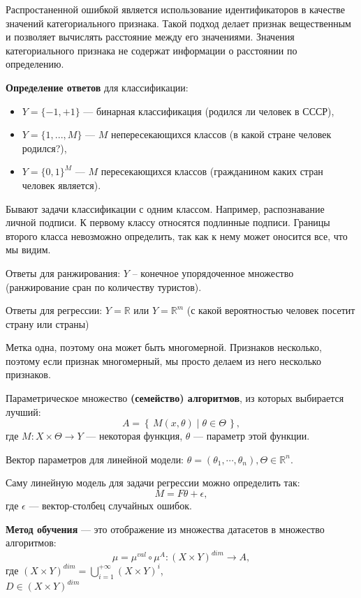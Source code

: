 Распростаненной ошибкой является использование идентификаторов в качестве
значений категориального признака. Такой подход делает признак вещественным
и позволяет вычислять расстояние между его значениями. Значения категориального
признака не содержат информации о расстоянии по определению.

\textbf{Определение ответов} для классификации:
\begin{itemize}
    \item $Y = \{-1, +1\}$ --- бинарная классификация (родился ли человек в
        СССР),
    \item $Y = \{1, ..., M\}$ --- $M$ непересекающихся классов (в какой стране
        человек родился?),
    \item $Y = \{0, 1\}^M $ --- $M$ пересекающихся классов (гражданином каких
        стран человек является).
\end{itemize}

Бывают задачи классификации с одним классом. Например, распознавание личной
подписи. К первому классу относятся подлинные подписи. Границы второго класса
невозможно определить, так как к нему может оносится все, что мы видим.

Ответы для ранжирования: $Y$ -- конечное упорядоченное множество (ранжирование
сран по количеству туристов).

Ответы для регрессии: $Y = \mathbb{R}$ или $Y = \mathbb{R}^m$ (с какой
вероятностью человек посетит страну или страны)

Метка одна, поэтому она может быть многомерной. Признаков несколько, поэтому если признак
многомерный, мы просто делаем из него несколько признаков.

Параметрическое множество \textbf{(семейство) алгоритмов}, из которых
выбирается лучший:
\[
A = \left\{\,M(x, \theta) \mid \theta \in \Theta\,\right\},
\] где $M : X \times \Theta \to Y$ --- некоторая функция, $\theta$ --- параметр
этой функции.

Вектор параметров для линейной модели:
$\theta = (\theta_1, \cdots, \theta_n), \Theta \in \mathbb{R}^n$.

Саму линейную модель для задачи регрессии можно определить так:
\[
M = F \theta + \epsilon,
\] где $\epsilon$ --- вектор-столбец случайных ошибок.

\textbf{Метод обучения} --- это отображение из множества датасетов в множество алгоритмов:
\[
    \mu = \mu^{val} \circ \mu^A : (X \times Y)^{dim} \to A,
\] где $(X \times Y)^{dim} = \bigcup_{i=1}^{+\infty} (X \times Y)^i$,\\
$D \in (X \times Y)^{dim}$

